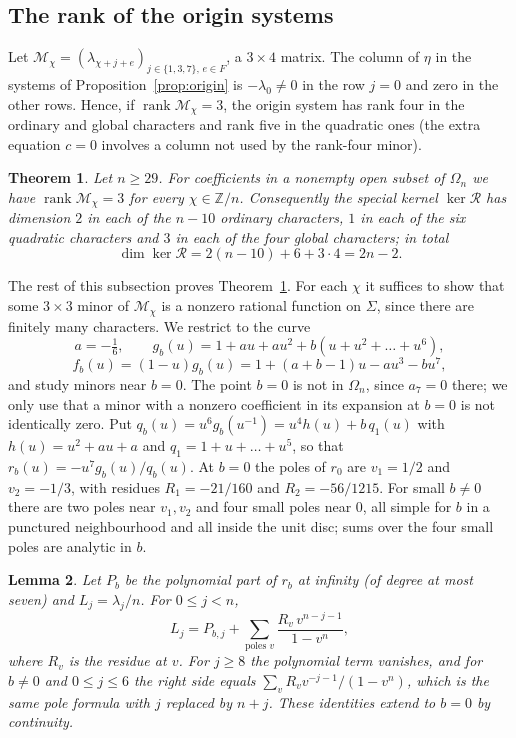 \documentclass{amsart}
\newtheorem{theorem}{Theorem}[section]
\newtheorem{lemma}[theorem]{Lemma}
\theoremstyle{definition}
\theoremstyle{remark}
\numberwithin{equation}{section}
\newcommand{\ZZ}{\mathbb{Z}}
\DeclareMathOperator{\rank}{rank}
\begin{document}
\subsection{The rank of the origin systems}
Let $\mathcal M_\chi=(\lambda_{\chi+j+e})_{j\in\{1,3,7\},\,e\in F}$, a $3\times4$
matrix. The column of $\eta$ in the systems of Proposition~\ref{prop:origin} is
$-\lambda_0\ne0$ in the row $j=0$ and zero in the other rows. Hence, if
$\rank\mathcal M_\chi=3$, the origin system has rank four in the ordinary and global
characters and rank five in the quadratic ones (the extra equation $c=0$ involves a
column not used by the rank-four minor).

\begin{theorem}\label{thm:special}
Let $n\ge29$. For coefficients in a nonempty open subset of $\Omega_n$ we have
$\rank\mathcal M_\chi=3$ for every $\chi\in\ZZ/n$. Consequently the special kernel
$\ker\mathcal R$ has dimension $2$ in each of the $n-10$ ordinary characters, $1$ in
each of the six quadratic characters and $3$ in each of the four global characters;
in total
\[
  \dim\ker\mathcal R=2(n-10)+6+3\cdot4=2n-2 .
\]
\end{theorem}

The rest of this subsection proves Theorem~\ref{thm:special}. For each $\chi$ it
suffices to show that some $3\times3$ minor of $\mathcal M_\chi$ is a nonzero rational
function on $\Sigma$, since there are finitely many characters. We restrict to the
curve
\[
  a=-\tfrac16,\qquad g_b(u)=1+au+au^2+b(u+u^2+\dots+u^6),
\]
\[
  f_b(u)=(1-u)g_b(u)=1+(a+b-1)u-au^3-bu^7 ,
\]
and study minors near $b=0$. The point $b=0$ is not in $\Omega_n$, since $a_7=0$ there;
we only use that a minor with a nonzero coefficient in its expansion at $b=0$ is not
identically zero. Put $q_b(u)=u^6g_b(u^{-1})=u^4h(u)+b\,q_1(u)$ with $h(u)=u^2+au+a$
and $q_1=1+u+\dots+u^5$, so that $r_b(u)=-u^7g_b(u)/q_b(u)$. At $b=0$ the poles of
$r_0$ are $v_1=1/2$ and $v_2=-1/3$, with residues $R_1=-21/160$ and
$R_2=-56/1215$. For small $b\ne0$ there are two poles near $v_1,v_2$ and four small
poles near $0$, all simple for $b$ in a punctured neighbourhood and all inside the
unit disc; sums over the four small poles are analytic in $b$.

\begin{lemma}\label{lem:poleformula}
Let $P_b$ be the polynomial part of $r_b$ at infinity (of degree at most seven) and
$L_j=\lambda_j/n$. For $0\le j<n$,
\[
  L_j=P_{b,j}+\sum_{\text{poles }v}\frac{R_v\,v^{n-j-1}}{1-v^n},
\]
where $R_v$ is the residue at $v$. For $j\ge8$ the polynomial term vanishes, and for
$b\ne0$ and $0\le j\le6$ the right side equals $\sum_vR_vv^{-j-1}/(1-v^n)$, which is
the same pole formula with $j$ replaced by $n+j$. These identities extend to $b=0$ by
continuity.
\end{lemma}
\end{document}
